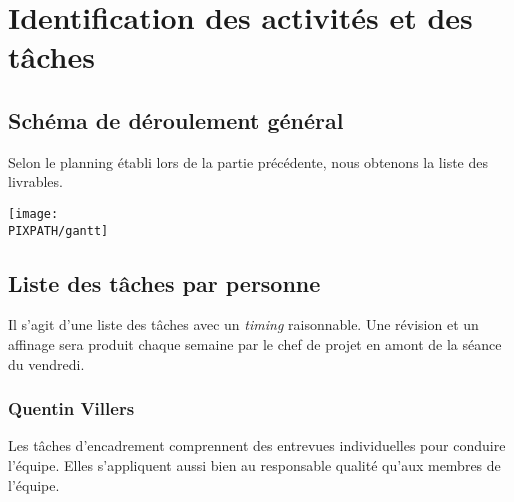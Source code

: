 \documentclass[twoside]{article}
\newcommand\PIXPATH{./docs/pics}
\begin{document}

\section{Identification des activités et des tâches}

\subsection{Schéma de déroulement général}

Selon le planning établi lors de la partie précédente, nous obtenons la liste des livrables.

\begin{center}
\texttt{[image: \\PIXPATH/gantt]}\hfill\\
\end{center}

\vfil
\pagebreak
\subsection{Liste des tâches par personne}

Il s'agit d'une liste des tâches avec un \textsl{timing} raisonnable.
Une révision et un affinage sera produit chaque semaine par le chef de projet
en amont de la séance du vendredi.

\subsubsection{Quentin Villers}

Les tâches d'encadrement comprennent des entrevues individuelles pour conduire l'équipe. 
Elles s'appliquent aussi bien au responsable qualité qu'aux membres de l'équipe. 
\end{document}
